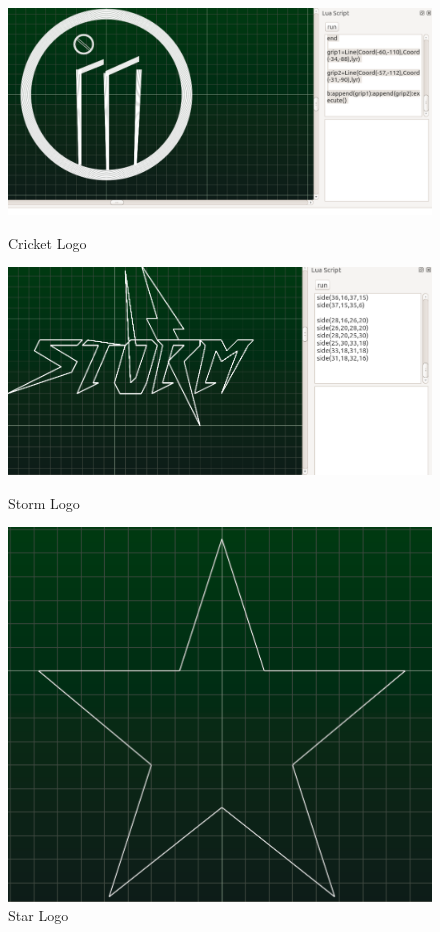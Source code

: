 \begin{figure}
\begin{center}
\includegraphics[scale=0.4]{images/dp/cl.png}
\caption{Cricket Logo}
\includegraphics[scale=0.4]{images/dp/sl.png} 
\caption{Storm Logo}
\includegraphics[scale=0.4]{images/dp/stl.png}
\caption{Star Logo}
\end{center}
\end{figure}
